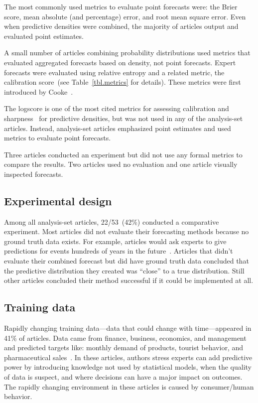 \documentclass[preprint,authoryear]{elsarticle}
\begin{document}
The most commonly used metrics to evaluate point forecasts were: the Brier score, mean absolute (and percentage) error, and root mean square error.
Even when predictive densities were combined, the majority of articles output and evaluated point estimates.

A small number of articles combining probability distributions used metrics that evaluated aggregated forecasts based on density, not point forecasts.
Expert forecasts were evaluated using relative entropy and a related metric, the calibration score~(see Table~\ref{tbl.metrics} for details).
These metrics were first introduced by Cooke~\citep{cooke1988calibration,cooke1991experts}.

The logscore is one of the most cited metrics for assessing calibration and sharpness~\citep{gneiting2007strictly,gneiting2011comparing,hora2015calibration} for predictive densities, but was not used in any of the analysis-set articles.
Instead, analysis-set articles emphasized point estimates and used metrics to evaluate point forecasts.

Three articles conducted an experiment but did not use any formal metrics to compare the results.
Two articles used no evaluation and one article visually inspected forecasts.

\subsection{Experimental design}

Among all analysis-set articles, 22/53~(42\%) conducted a comparative experiment.
Most articles did not evaluate their forecasting methods because no ground truth data exists.
For example, articles would ask experts to give predictions for events hundreds of years in the future~\citep{zio1997accounting,zio1996use}.
Articles that didn't evaluate their combined forecast but did have ground truth data concluded that the predictive distribution they created was ``close'' to a true distribution.
Still other articles concluded their method successful if it could be implemented at all.

\subsection{Training data}
Rapidly changing training data---data that could change with time---appeared in 41\% of articles.
Data came from finance, business, economics, and management and predicted targets like: monthly demand of products, tourist behavior, and pharmaceutical sales~\citep{baecke2017investigating,petrovic2006fuzzy,wang2008probabilistic,klas2010support,franses2011averaging}.
In these articles, authors stress experts can add predictive power by introducing knowledge not used by statistical models, when the quality of data is suspect, and where decisions can have a major impact on outcomes. 
The rapidly changing environment in these articles is caused by consumer/human behavior.
\end{document}
